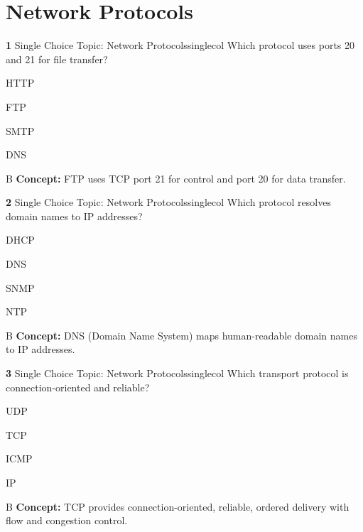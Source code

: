 \documentclass[10pt,a4paper]{article}
\begin{document}
\section{Network Protocols}
\begin{qcard}{\color{white}\textbf{1} \hfill \small Single Choice \textbar{} Topic: Network Protocols}{singlecol}
Which protocol uses ports 20 and 21 for file transfer?

\begin{qoptions}
\item HTTP
\item FTP
\item SMTP
\item DNS
\end{qoptions}
\begin{explainbox}{B}
\textbf{Concept:} FTP uses TCP port 21 for control and port 20 for data transfer.
\end{explainbox}
\end{qcard}

\begin{qcard}{\color{white}\textbf{2} \hfill \small Single Choice \textbar{} Topic: Network Protocols}{singlecol}
Which protocol resolves domain names to IP addresses?

\begin{qoptions}
\item DHCP
\item DNS
\item SNMP
\item NTP
\end{qoptions}
\begin{explainbox}{B}
\textbf{Concept:} DNS (Domain Name System) maps human-readable domain names to IP addresses.
\end{explainbox}
\end{qcard}

\begin{qcard}{\color{white}\textbf{3} \hfill \small Single Choice \textbar{} Topic: Network Protocols}{singlecol}
Which transport protocol is connection-oriented and reliable?

\begin{qoptions}
\item UDP
\item TCP
\item ICMP
\item IP
\end{qoptions}
\begin{explainbox}{B}
\textbf{Concept:} TCP provides connection-oriented, reliable, ordered delivery with flow and congestion control.
\end{explainbox}
\end{qcard}
\end{document}
